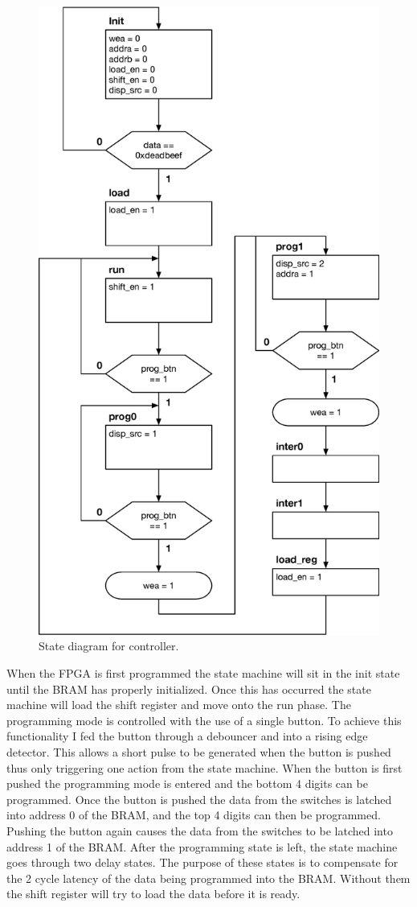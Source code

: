 \documentclass[11pt]{article}
\begin{document}
\begin{figure}[H]
\includegraphics[width=4.5 in]{./figures/state_diagram}
	\centering
	\caption{State diagram for controller.}
	\label{fig:state_diagram}
\end{figure}

When the FPGA is first programmed the state machine will sit in the init state until the BRAM has properly initialized. Once this has occurred the state machine will load the shift register and move onto the run phase. The programming mode is controlled with the use of a single button. To achieve this functionality I fed the button through a debouncer and into a rising edge detector. This allows a short pulse to be generated when the button is pushed thus only triggering one action from the state machine. When the button is first pushed the programming mode is entered and the bottom 4 digits can be programmed. Once the button is pushed the data from the switches is latched into address 0 of the BRAM, and the top 4 digits can then be programmed. Pushing the button again causes the data from the switches to be latched into address 1 of the BRAM. After the programming state is left, the state machine goes through two delay states. The purpose of these states is to compensate for the 2 cycle latency of the data being programmed into the BRAM. Without them the shift register will try to load the data before it is ready.
\end{document}
